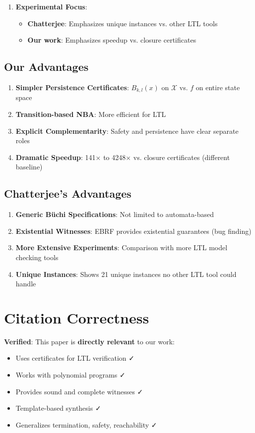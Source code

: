 \documentclass{article}
\begin{document}
\begin{enumerate}
\begin{enumerate}
    \item \textbf{Experimental Focus}:
    \begin{itemize}
        \item \textbf{Chatterjee}: Emphasizes unique instances vs. other LTL tools
        \item \textbf{Our work}: Emphasizes speedup vs. closure certificates
    \end{itemize}
\end{enumerate}

\subsection{Our Advantages}

\begin{enumerate}
    \item \textbf{Simpler Persistence Certificates}: $B_{k,l}(x)$ on $\mathcal{X}$ vs. $f$ on entire state space
    \item \textbf{Transition-based NBA}: More efficient for LTL
    \item \textbf{Explicit Complementarity}: Safety and persistence have clear separate roles
    \item \textbf{Dramatic Speedup}: 141× to 4248× vs. closure certificates (different baseline)
\end{enumerate}

\subsection{Chatterjee's Advantages}

\begin{enumerate}
    \item \textbf{Generic Büchi Specifications}: Not limited to automata-based
    \item \textbf{Existential Witnesses}: EBRF provides existential guarantees (bug finding)
    \item \textbf{More Extensive Experiments}: Comparison with more LTL model checking tools
    \item \textbf{Unique Instances}: Shows 21 unique instances no other LTL tool could handle
\end{enumerate}

\section{Citation Correctness}

\textbf{Verified}: This paper is \textbf{directly relevant} to our work:
\begin{itemize}
    \item Uses certificates for LTL verification ✓
    \item Works with polynomial programs ✓
    \item Provides sound and complete witnesses ✓
    \item Template-based synthesis ✓
    \item Generalizes termination, safety, reachability ✓
\end{itemize}


\end{enumerate}
\end{document}
